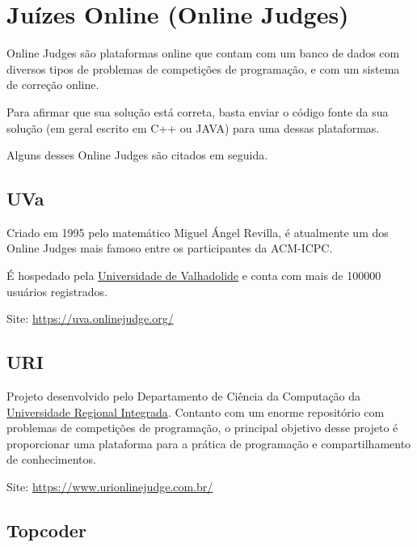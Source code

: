 
\chapter{Juízes Online (Online Judges)} %

\label{AppendixB} %

Online Judges são plataformas online que contam com um banco de dados com diversos tipos de problemas de competições de programação, e com um sistema de correção online.

Para afirmar que sua solução está correta, basta enviar o código fonte da sua solução (em geral escrito em C++ ou JAVA) para uma dessas plataformas.

Alguns desses Online Judges são citados em seguida.


\section{UVa} 
	
Criado em 1995 pelo matemático Miguel Ángel Revilla, é atualmente um dos Online Judges mais famoso entre os participantes da ACM-ICPC.

É hospedado pela \href{http://www.uva.es/export/sites/uva/}{Universidade de Valhadolide} e conta com mais de 100000 usuários registrados.

Site: \href{https://uva.onlinejudge.org/}{https://uva.onlinejudge.org/}


\section{URI}

Projeto desenvolvido pelo Departamento de Ciência da Computação da \href{http://www.uri.br/}{Universidade Regional Integrada}.
Contanto com um enorme repositório com problemas de competições de programação, o principal objetivo desse projeto é proporcionar uma 
plataforma para a prática de programação e compartilhamento de conhecimentos.

Site: \href{https://www.urionlinejudge.com.br/}{https://www.urionlinejudge.com.br/}

\section{Topcoder} 

